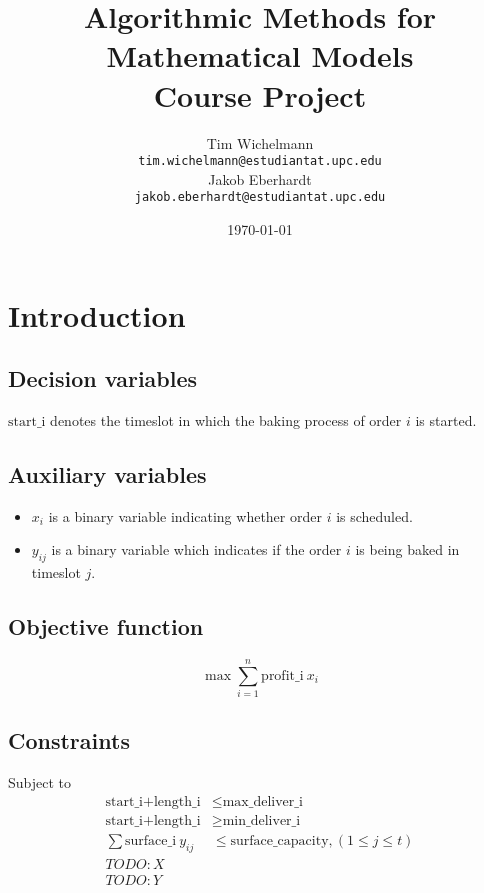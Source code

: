 \documentclass{article}
\title{Algorithmic Methods for Mathematical Models\\
  Course Project }
\author{Tim Wichelmann\\ \texttt{tim.wichelmann@estudiantat.upc.edu}\\[1ex] %
  Jakob Eberhardt\\ \texttt{jakob.eberhardt@estudiantat.upc.edu}}
\date{\today}
\begin{document}
\maketitle

\section{Introduction}

\subsection{Decision variables}

$\text{start\_i}$ denotes the timeslot in which the baking process of order $i$ is started.

\subsection{Auxiliary variables}

\begin{itemize}
\item $x_i$ is a binary variable indicating whether order $i$ is scheduled.
\item $y_{ij}$ is a binary variable which indicates if the order $i$ is being baked in timeslot $j$.
\end{itemize}

\subsection{Objective function}

\begin{equation*}
  \max \sum^n_{i = 1} \text{profit\_i} \: x_i
\end{equation*}

\subsection{Constraints}

Subject to
\begin{align}
  \text{start\_i} + \text{length\_i} &\leq \text{max\_deliver\_i} \\
  \text{start\_i} + \text{length\_i} &\geq \text{min\_deliver\_i} \\
  \sum \text{surface\_i} \: y_{ij} &\leq \text{surface\_capacity}, (1 \leq j \leq t) \\
  TODO: X \\
  TODO: Y
\end{align}
\end{document}

